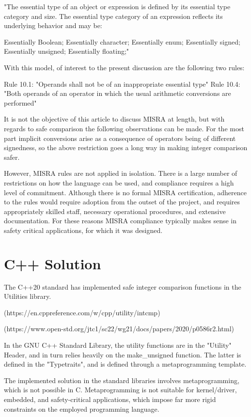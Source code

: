 \documentclass[11pt,letterpaper]{article}
\begin{document}
"The essential type of an object or expression is defined by its essential type category and size. The essential type category of an expression reflects its underlying behavior and may be:

Essentially Boolean;
Essentially character;
Essentially enum;
Essentially signed;
Essentially unsigned;
Essentially floating;"

With this model, of interest to the present discussion are the following two rules:

Rule 10.1: "Operands shall not be of an inappropriate essential type"
Rule 10.4: "Both operands of an operator in which the usual arithmetic conversions are performed"

It is not the objective of this article to discuss MISRA at length, but with regards to safe comparison the following observations can be made. For the most part implicit conversions arise as a consequence of operators being of different signedness, so the above restriction goes a long way in making integer comparison safer. 

However, MISRA rules are not applied in isolation. There is a large number of restrictions on how the language can be used, and compliance requires a high level of commitment. Although there is no formal MISRA certification, adherence to the rules would require adoption from the outset of the project, and requires appropriately skilled staff, necessary operational procedures, and extensive documentation. For these reasons MISRA compliance typically makes sense in safety critical applications, for which it was designed. 

\section{C++ Solution}
\label{sec:cppimplementation}

The C++20 standard has implemented safe integer comparison functions in the Utilities library.

(https://en.cppreference.com/w/cpp/utility/intcmp)

(https://www.open-std.org/jtc1/sc22/wg21/docs/papers/2020/p0586r2.html)

In the GNU C++ Standard Library, the utility functions are in the "Utility" Header, and in turn relies heavily on the make_unsigned function. The latter is defined in the "Typetraits", and is defined through a metaprogramming template. 

The implemented solution in the standard libraries involves metaprogramming, which is not possible in C. Metaprogramming is not suitable for kernel/driver, embedded, and safety-critical applications, which impose far more rigid constraints on the employed programming language.   
\end{document}
